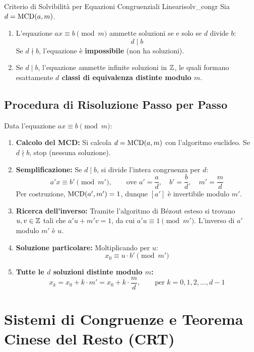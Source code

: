 \begin{teorema}{Criterio di Solvibilità per Equazioni Congruenziali Lineari}{solv_congr}
Sia $d = \operatorname{MCD}(a, m)$.
\begin{enumerate}
    \item L'equazione $ax \equiv b \pmod m$ ammette soluzioni se e solo se $d$ divide $b$:
    \[
        d \mid b
    \]
    Se $d \nmid b$, l'equazione è \textbf{impossibile} (non ha soluzioni).
    \item Se $d \mid b$, l'equazione ammette infinite soluzioni in $\mathbb{Z}$, le quali formano esattamente \textbf{$d$ classi di equivalenza distinte modulo $m$}.
\end{enumerate}
\end{teorema}

\subsection{Procedura di Risoluzione Passo per Passo}
Data l'equazione $ax \equiv b \pmod m$:
\begin{enumerate}
    \item \textbf{Calcolo del MCD:} Si calcola $d = \operatorname{MCD}(a, m)$ con l'algoritmo euclideo. Se $d \nmid b$, stop (nessuna soluzione).
    \item \textbf{Semplificazione:} Se $d \mid b$, si divide l'intera congruenza per $d$:
    \[
        a' x \equiv b' \pmod{m'}, \qquad \text{ove } a' = \frac{a}{d}, \quad b' = \frac{b}{d}, \quad m' = \frac{m}{d}
    \]
    Per costruzione, $\operatorname{MCD}(a', m') = 1$, dunque $[a']$ è invertibile modulo $m'$.
    \item \textbf{Ricerca dell'inverso:} Tramite l'algoritmo di Bézout esteso si trovano $u, v \in \mathbb{Z}$ tali che $a'u + m'v = 1$, da cui $a'u \equiv 1 \pmod{m'}$. L'inverso di $a'$ modulo $m'$ è $u$.
    \item \textbf{Soluzione particolare:} Moltiplicando per $u$:
    \[
        x_0 \equiv u \cdot b' \pmod{m'}
    \]
    \item \textbf{Tutte le $d$ soluzioni distinte modulo $m$:}
    \[
        x_k = x_0 + k \cdot m' = x_0 + k \cdot \frac{m}{d}, \qquad \text{per } k = 0, 1, 2, \dots, d-1
    \]
\end{enumerate}

\section{Sistemi di Congruenze e Teorema Cinese del Resto (CRT)}

